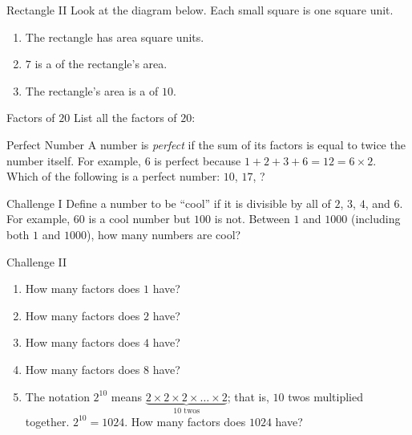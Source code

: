 \documentclass[12pt,letterpaper]{article}
\begin{document}
\begin{problem}{Rectangle II}
 Look at the diagram below. Each small square is one square unit.

 \begin{center}
 \end{center}

 \begin{enumerate}
  \item The rectangle has area  square units.
  \item $7$ is a  of the rectangle's area.
  \item The rectangle's area is a  of $10$.
 \end{enumerate}
\end{problem}

\begin{problem}{Factors of $20$}
 List all the factors of $20$: 
\end{problem}

\begin{problem}{Perfect Number}
 A number is \emph{perfect} if the sum of its factors is equal to twice the
 number itself. For example, $6$ is perfect because $1+2+3+6=12=6\times2$. Which
 of the following is a perfect number: $10$, $17$, ?
\end{problem}

\begin{problem}{Challenge I}
 Define a number to be ``cool'' if it is divisible by all of $2$, $3$, $4$, and
 $6$. For example, $60$ is a cool number but $100$ is not. Between $1$ and
 $1000$ (including both $1$ and $1000$), how many numbers are cool? 
\end{problem}

\begin{problem}{Challenge II}
 \begin{enumerate}
  \item How many factors does $1$ have? 
  \item How many factors does $2$ have? 
  \item How many factors does $4$ have? 
  \item How many factors does $8$ have? 
  \item The notation $2^{10}$ means $\underbrace{ 2\times2\times2\times
  \ldots\times2}_\text{$10$ twos}$; that is, $10$ twos multiplied together.
  $2^{10}=1024$. How many factors does $1024$ have? 
 \end{enumerate}
\end{problem}
\end{document}
